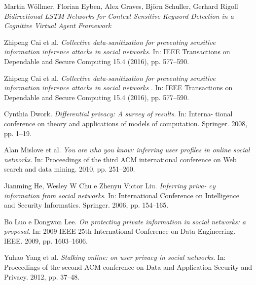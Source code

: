 \begin{thebibliography}{9}
Martin Wöllmer, Florian Eyben, Alex Graves, Björn Schuller, Gerhard Rigoll \newline
\textit{Bidirectional LSTM Networks for Context-Sensitive Keyword Detection in a Cognitive Virtual Agent Framework}

Zhipeng Cai et al.\newline
\textit{Collective data-sanitization for preventing sensitive information inference attacks in social networks}.\newline
In: IEEE Transactions on Dependable and Secure Computing 15.4 (2016), pp. 577–590.

Zhipeng Cai et al.\newline
\textit{Collective data-sanitization for preventing sensitive information inference attacks in social networks}\newline
. In: IEEE Transactions on Dependable and Secure Computing 15.4 (2016), pp. 577–590.

Cynthia Dwork.\newline
\textit{Differential privacy: A survey of results}.\newline
In: Interna- tional conference on theory and applications of models of computation. Springer. 2008, pp. 1–19.

Alan Mislove et al. \newline
\textit{You are who you know: inferring user profiles in online social networks}.\newline
In: Proceedings of the third ACM international conference on Web search and data mining. 2010, pp. 251–260.

Jianming He, Wesley W Chu e Zhenyu Victor Liu. \newline
\textit{Inferring priva- cy information from social networks}.\newline
In: International Conference on Intelligence and Security Informatics. Springer. 2006, pp. 154–165.

Bo Luo e Dongwon Lee.\newline
\textit{On protecting private information in social networks: a proposal}.\newline
In: 2009 IEEE 25th International Conference on Data Engineering. IEEE. 2009, pp. 1603–1606.

Yuhao Yang et al.\newline
\textit{Stalking online: on user privacy in social networks}.\newline
In: Proceedings of the second ACM conference on Data and Application Security and Privacy. 2012, pp. 37–48.


\end{thebibliography}
